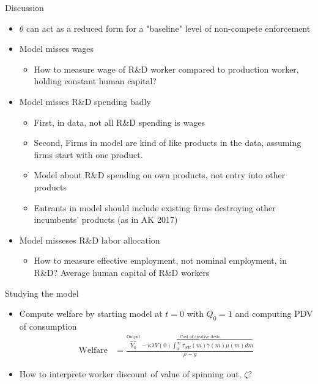 \documentclass[english,usenames,dvipsnames]{beamer}
\begin{document}
\begin{frame}{Discussion}
\begin{itemize}
	\item $\theta$ can act as a reduced form for a "baseline" level of non-compete enforcement
	\item Model misses wages
	\begin{itemize}
		\footnotesize
		\item How to measure wage of R\&D worker compared to production worker, holding constant human capital?
	\end{itemize}
	\item Model misses R\&D spending badly
	\begin{itemize}
		\footnotesize
		\item First, in data, not all R\&D spending is wages
		\item Second, Firms in model are kind of like products in the data, assuming firms start with one product. 
		\item Model about R\&D spending on own products, not entry into other products
		\item Entrants in model should include existing firms destroying other incumbents' products (as in AK 2017)
	\end{itemize}
	\normalsize
	\item Model misseses R\&D labor allocation
	\begin{itemize}
		\footnotesize
		\item How to measure effective employment, not nominal employment, in R\&D? Average human capital of R\&D workers
	\end{itemize}
\end{itemize}
\end{frame}

\begin{frame}{Studying the model}
\begin{itemize}
	\item Compute welfare by starting model at $t=0$ with $Q_0 = 1$ and computing PDV of consumption
	\begin{align*}
		\textrm{Welfare} &= \frac{\overbrace{Y_0}^{\textrm{Output}} - \overbrace{\kappa \lambda V(0) \int_0^{\infty} \tau_{SE}(m) \gamma(m) \mu(m) dm}^{\textrm{Cost of creative destr.}}}{\rho - g} 
	\end{align*}
	\item How to interprete worker discount of value of spinning out, $\zeta$? 
\end{itemize}
\end{frame}
\end{document}
